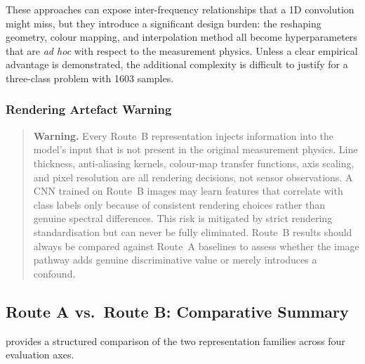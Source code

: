 These approaches can expose inter-frequency relationships that a 1D
convolution might miss, but they introduce a significant design burden:
the reshaping geometry, colour mapping, and interpolation method all
become hyperparameters that are \emph{ad hoc} with respect to the
measurement physics.  Unless a clear empirical advantage is demonstrated,
the additional complexity is difficult to justify for a
three-class problem with \num{1603} samples.

\subsubsection{Rendering Artefact Warning}
\label{sec:repr:routeB:warning}

\begin{quote}
\textbf{Warning.}  Every Route~B representation injects information
into the model's input that is not present in the original measurement
physics.  Line thickness, anti-aliasing kernels, colour-map transfer
functions, axis scaling, and pixel resolution are all rendering
decisions, not sensor observations.  A CNN trained on Route~B images may
learn features that correlate with class labels only because of
consistent rendering choices rather than genuine spectral differences.
This risk is mitigated by strict rendering standardisation but can never
be fully eliminated.  Route~B results should always be compared against
Route~A baselines to assess whether the image pathway adds genuine
discriminative value or merely introduces a confound.
\end{quote}

\subsection{Route A vs.\ Route B: Comparative Summary}
\label{sec:repr:comparison}

 provides a structured comparison of the two
representation families across four evaluation axes.

